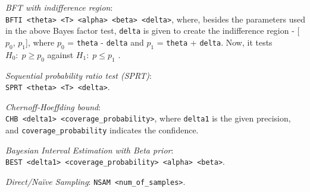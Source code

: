\textit {BFT with indifference region}: \\ \verb+BFTI <theta> <T> <alpha> <beta> <delta>+,
where, besides the parameters used in the above Bayes factor test, \verb+delta+ is given to create the indifference region - [$p_0$, $p_1$], where $p_0$ = \verb+theta+ - \verb+delta+ and $p_1$ = \verb+theta+  + \verb+delta+.  Now, it tests $H_0 :\; p \ge p_0$ against $H_1:\; p \le p_1$ .

\textit {Sequential probability ratio test (SPRT)}: \\ \verb+SPRT <theta> <T> <delta>+.

\textit {Chernoff-Hoeffding bound}:\\ \verb+CHB <delta1> <coverage_probability>+,
where \verb+delta1+ is the given precision, and \verb+coverage_probability+ indicates the confidence.

\textit {Bayesian Interval Estimation with Beta prior}: \\ \verb+BEST <delta1> <coverage_probability> <alpha> <beta>+.

\textit {Direct/Na\"{i}ve Sampling}: \verb+NSAM <num_of_samples>+.


